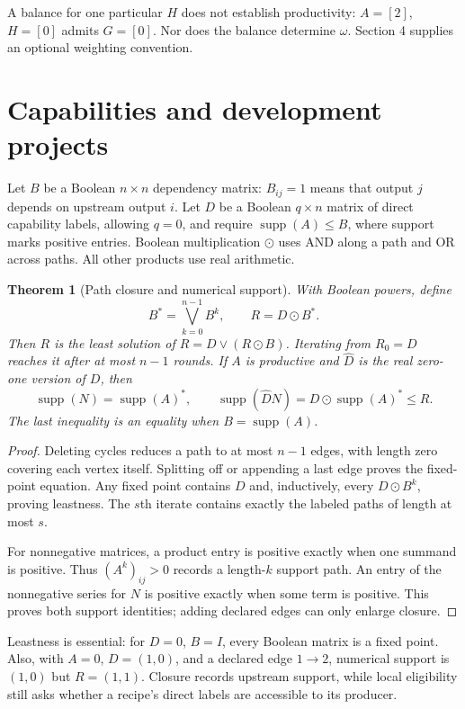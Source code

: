 \documentclass[11pt,a4paper]{article}
\newtheorem{theorem}{Theorem}[section]
\begin{document}
A balance for one particular $H$ does not establish productivity: $A=[2]$, $H=[0]$ admits $G=[0]$. Nor does the balance determine $\omega$. Section 4 supplies an optional weighting convention.

\section{Capabilities and development projects}
Let $B$ be a Boolean $n\times n$ dependency matrix: $B_{ij}=1$ means that output $j$ depends on upstream output $i$. Let $D$ be a Boolean $q\times n$ matrix of direct capability labels, allowing $q=0$, and require $\operatorname{supp}(A)\leq B$, where support marks positive entries. Boolean multiplication $\odot$ uses AND along a path and OR across paths. All other products use real arithmetic.

\begin{theorem}[Path closure and numerical support]
With Boolean powers, define
\begin{equation}
B^*=\bigvee_{k=0}^{n-1}B^k,\qquad R=D\odot B^*.
\end{equation}
Then $R$ is the least solution of $R=D\vee(R\odot B)$. Iterating from $R_0=D$ reaches it after at most $n-1$ rounds. If $A$ is productive and $\widehat D$ is the real zero-one version of $D$, then
\begin{equation}
\operatorname{supp}(N)=\operatorname{supp}(A)^*,\qquad
\operatorname{supp}(\widehat D N)=D\odot\operatorname{supp}(A)^*\leq R.
\end{equation}
The last inequality is an equality when $B=\operatorname{supp}(A)$.
\end{theorem}
\begin{proof}
Deleting cycles reduces a path to at most $n-1$ edges, with length zero covering each vertex itself. Splitting off or appending a last edge proves the fixed-point equation. Any fixed point contains $D$ and, inductively, every $D\odot B^k$, proving leastness. The $s$th iterate contains exactly the labeled paths of length at most $s$.

For nonnegative matrices, a product entry is positive exactly when one summand is positive. Thus $(A^k)_{ij}>0$ records a length-$k$ support path. An entry of the nonnegative series for $N$ is positive exactly when some term is positive. This proves both support identities; adding declared edges can only enlarge closure.
\end{proof}

Leastness is essential: for $D=0$, $B=I$, every Boolean matrix is a fixed point. Also, with $A=0$, $D=(1,0)$, and a declared edge $1\to2$, numerical support is $(1,0)$ but $R=(1,1)$. Closure records upstream support, while local eligibility still asks whether a recipe's direct labels are accessible to its producer.
\end{document}
